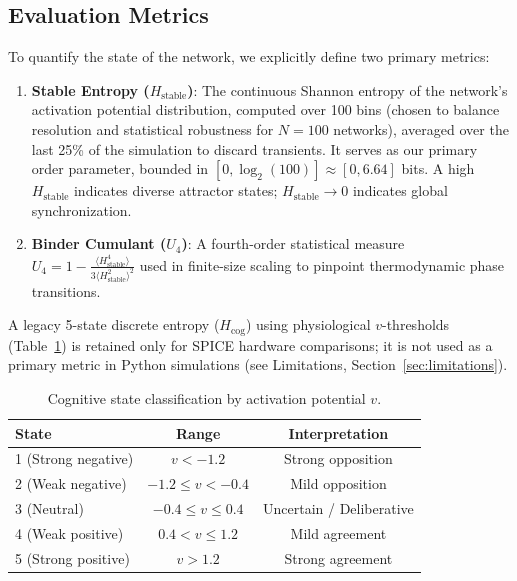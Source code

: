 \documentclass[11pt]{article}
\begin{document}
\subsection{Evaluation Metrics}
\label{sec:metrics}

To quantify the state of the network, we explicitly define two primary metrics:
\begin{enumerate}
    \item \textbf{Stable Entropy ($H_{\text{stable}}$)}: The continuous Shannon entropy of the network's activation potential distribution, computed over 100 bins (chosen to balance resolution and statistical robustness for $N=100$ networks), averaged over the last 25\% of the simulation to discard transients. It serves as our primary order parameter, bounded in $[0, \log_2(100)] \approx [0, 6.64]$ bits. A high $H_{\text{stable}}$ indicates diverse attractor states; $H_{\text{stable}} \to 0$ indicates global synchronization.
    \item \textbf{Binder Cumulant ($U_4$)}: A fourth-order statistical measure $U_4 = 1 - \frac{\langle H_{\text{stable}}^4 \rangle}{3\langle H_{\text{stable}}^2 \rangle^2}$ used in finite-size scaling to pinpoint thermodynamic phase transitions.
\end{enumerate}
A legacy 5-state discrete entropy ($H_{\text{cog}}$) using physiological $v$-thresholds (Table~\ref{tab:states}) is retained only for SPICE hardware comparisons; it is not used as a primary metric in Python simulations (see Limitations, Section~\ref{sec:limitations}).

\begin{table}[ht]
\centering
\caption{Cognitive state classification by activation potential $v$.}
\label{tab:states}
\begin{tabular}{lcc}
\toprule
\textbf{State} & \textbf{Range} & \textbf{Interpretation} \\
\midrule
1 (Strong negative) & $v < -1.2$ & Strong opposition \\
2 (Weak negative)   & $-1.2 \leq v < -0.4$ & Mild opposition \\
3 (Neutral)         & $-0.4 \leq v \leq 0.4$ & Uncertain / Deliberative \\
4 (Weak positive)   & $0.4 < v \leq 1.2$ & Mild agreement \\
5 (Strong positive) & $v > 1.2$ & Strong agreement \\
\bottomrule
\end{tabular}
\end{table}
\end{document}

